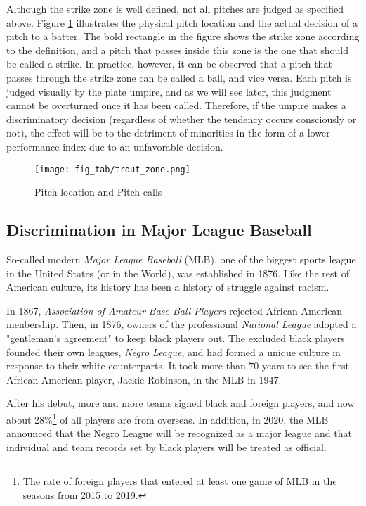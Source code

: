 \documentclass[dvipdfmx, 12pt]{jsarticle}
\begin{document}
Although the strike zone is well defined, not all pitches are judged as specified above. Figure \ref{pitchcall_illustration} illustrates the physical pitch location and the actual decision of a pitch to a batter. The bold rectangle in the figure shows the strike zone according to the definition, and a pitch that passes inside this zone is the one that should be called a strike. In practice, however, it can be observed that a pitch that passes through the strike zone can be called a ball, and vice versa. Each pitch is judged visually by the plate umpire, and as we will see later, this judgment cannot be overturned once it has been called. Therefore, if the umpire makes a discriminatory decision (regardless of whether the tendency occurs consciously or not), the effect will be to the detriment of minorities in the form of a lower performance index due to an unfavorable decision.

\begin{figure}[ht]
    \caption{Pitch location and Pitch calls}
    \label{pitchcall_illustration}
    \centering
    \texttt{[image: fig\_tab/trout\_zone.png]}
\end{figure}

\subsection{Discrimination in Major League Baseball}

So-called modern \textit{Major League Baseball} (MLB), one of the biggest sports league in the United States (or in the World), was established in 1876. Like the rest of American culture, its history has been a history of struggle against racism.

In 1867, \textit{Association of Amateur Base Ball Players} rejected African American menbership. Then, in 1876, owners of the professional \textit{National League} adopted a "gentleman's agreement" to keep black players out. The excluded black players founded their own leagues, \textit{Negro League}, and had formed a unique culture in response to their white counterparts. It took more than 70 years to see the first African-American player, Jackie Robinson, in the MLB in 1947.

After his debut, more and more teams signed black and foreign players, and now about 28\%\footnote{The rate of foreign players that entered at least one game of MLB in the seasons from 2015 to 2019.} of all players are from overseas.  In addition, in 2020, the MLB announced that the Negro League will be recognized as a major league and that individual and team records set by black players will be treated as official.
\end{document}
